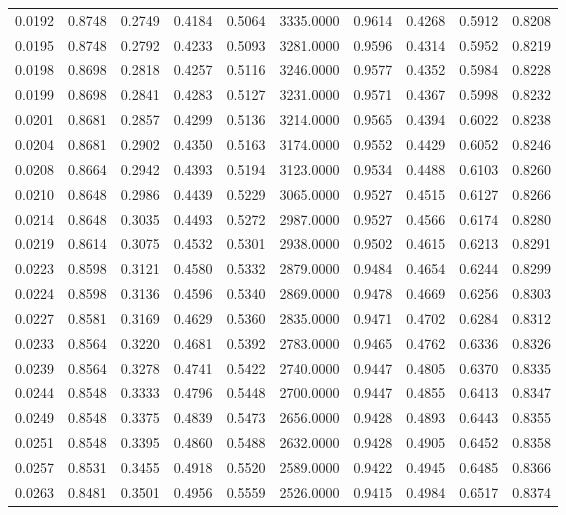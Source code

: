 \begin{tabular}{rrrrrrrrrr}
0.0192 & 0.8748 & 0.2749 & 0.4184 & 0.5064 & 3335.0000 & 0.9614 & 0.4268 & 0.5912 & 0.8208 \\
0.0195 & 0.8748 & 0.2792 & 0.4233 & 0.5093 & 3281.0000 & 0.9596 & 0.4314 & 0.5952 & 0.8219 \\
0.0198 & 0.8698 & 0.2818 & 0.4257 & 0.5116 & 3246.0000 & 0.9577 & 0.4352 & 0.5984 & 0.8228 \\
0.0199 & 0.8698 & 0.2841 & 0.4283 & 0.5127 & 3231.0000 & 0.9571 & 0.4367 & 0.5998 & 0.8232 \\
0.0201 & 0.8681 & 0.2857 & 0.4299 & 0.5136 & 3214.0000 & 0.9565 & 0.4394 & 0.6022 & 0.8238 \\
0.0204 & 0.8681 & 0.2902 & 0.4350 & 0.5163 & 3174.0000 & 0.9552 & 0.4429 & 0.6052 & 0.8246 \\
0.0208 & 0.8664 & 0.2942 & 0.4393 & 0.5194 & 3123.0000 & 0.9534 & 0.4488 & 0.6103 & 0.8260 \\
0.0210 & 0.8648 & 0.2986 & 0.4439 & 0.5229 & 3065.0000 & 0.9527 & 0.4515 & 0.6127 & 0.8266 \\
0.0214 & 0.8648 & 0.3035 & 0.4493 & 0.5272 & 2987.0000 & 0.9527 & 0.4566 & 0.6174 & 0.8280 \\
0.0219 & 0.8614 & 0.3075 & 0.4532 & 0.5301 & 2938.0000 & 0.9502 & 0.4615 & 0.6213 & 0.8291 \\
0.0223 & 0.8598 & 0.3121 & 0.4580 & 0.5332 & 2879.0000 & 0.9484 & 0.4654 & 0.6244 & 0.8299 \\
0.0224 & 0.8598 & 0.3136 & 0.4596 & 0.5340 & 2869.0000 & 0.9478 & 0.4669 & 0.6256 & 0.8303 \\
0.0227 & 0.8581 & 0.3169 & 0.4629 & 0.5360 & 2835.0000 & 0.9471 & 0.4702 & 0.6284 & 0.8312 \\
0.0233 & 0.8564 & 0.3220 & 0.4681 & 0.5392 & 2783.0000 & 0.9465 & 0.4762 & 0.6336 & 0.8326 \\
0.0239 & 0.8564 & 0.3278 & 0.4741 & 0.5422 & 2740.0000 & 0.9447 & 0.4805 & 0.6370 & 0.8335 \\
0.0244 & 0.8548 & 0.3333 & 0.4796 & 0.5448 & 2700.0000 & 0.9447 & 0.4855 & 0.6413 & 0.8347 \\
0.0249 & 0.8548 & 0.3375 & 0.4839 & 0.5473 & 2656.0000 & 0.9428 & 0.4893 & 0.6443 & 0.8355 \\
0.0251 & 0.8548 & 0.3395 & 0.4860 & 0.5488 & 2632.0000 & 0.9428 & 0.4905 & 0.6452 & 0.8358 \\
0.0257 & 0.8531 & 0.3455 & 0.4918 & 0.5520 & 2589.0000 & 0.9422 & 0.4945 & 0.6485 & 0.8366 \\
0.0263 & 0.8481 & 0.3501 & 0.4956 & 0.5559 & 2526.0000 & 0.9415 & 0.4984 & 0.6517 & 0.8374 \\

\end{tabular}
